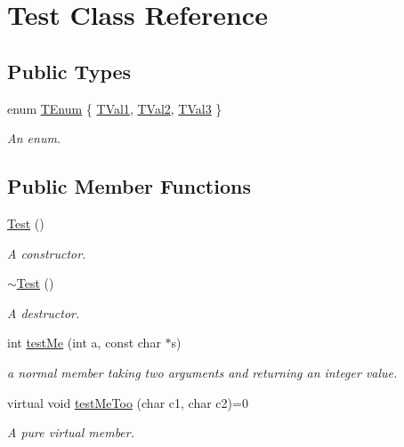 \hypertarget{classTest}{
\section{Test Class Reference}
\label{classTest}
}
\subsection*{Public Types}
\begin{DoxyCompactItemize}
\item 
enum \hyperlink{classTest_ad8d13fe56b896633273087859b89a1a3}{TEnum} \{ \hyperlink{classTest_ad8d13fe56b896633273087859b89a1a3abf8059769020a35c76df3d8b02521273}{TVal1}, 
\hyperlink{classTest_ad8d13fe56b896633273087859b89a1a3a38ab2f54365cee5e5561b04f32f053e3}{TVal2}, 
\hyperlink{classTest_ad8d13fe56b896633273087859b89a1a3ad63507e26f2168659722f1ef575b50b2}{TVal3}
 \}
\begin{DoxyCompactList}\small\item\em An enum. \item\end{DoxyCompactList}\end{DoxyCompactItemize}
\subsection*{Public Member Functions}
\begin{DoxyCompactItemize}
\item 
\hyperlink{classTest_a99f2bbfac6c95612322b0f10e607ebe5}{Test} ()
\begin{DoxyCompactList}\small\item\em A constructor. \item\end{DoxyCompactList}\item 
\hyperlink{classTest_a2b0a62f1e667bbe8d8cb18d785bfa991}{$\sim$Test} ()
\begin{DoxyCompactList}\small\item\em A destructor. \item\end{DoxyCompactList}\item 
int \hyperlink{classTest_af7115d71dda64654a7104c24f130e8d0}{testMe} (int a, const char $\ast$s)
\begin{DoxyCompactList}\small\item\em a normal member taking two arguments and returning an integer value. \item\end{DoxyCompactList}\item 
virtual void \hyperlink{classTest_a3edb9fdc1e9f0d5274b57386ab03704c}{testMeToo} (char c1, char c2)=0
\begin{DoxyCompactList}\small\item\em A pure virtual member. \item\end{DoxyCompactList}\end{DoxyCompactItemize}
